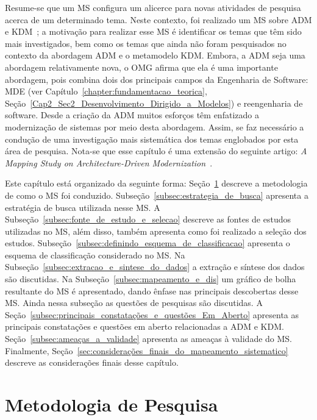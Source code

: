 Resume-se que um MS configura um alicerce para novas atividades de pesquisa acerca de um determinado tema. Neste contexto, foi realizado um MS sobre ADM e KDM~\cite{durelli_systematic_mapping}; a motivação para realizar esse MS é identificar os temas que têm sido mais investigados, bem como os temas que ainda não foram pesquisados no contexto da abordagem ADM e o metamodelo KDM. Embora, a ADM seja uma abordagem relativamente nova, o OMG afirma que ela é uma importante abordagem, pois combina dois dos principais campos da Engenharia de Software: MDE (ver Capítulo~\ref{chapter:fundamentacao_teorica}, Seção~\ref{Cap2_Sec2_Desenvolvimento_Dirigido_a_Modelos}) e reengenharia de software. Desde a criação da ADM muitos esforços têm enfatizado a modernização de sistemas por meio desta abordagem. Assim, se faz necessário a condução de uma investigação mais sistemática dos temas englobados por esta área de pesquisa. Nota-se que esse capítulo é uma extensão do seguinte artigo: \textit{A Mapping Study on Architecture-Driven Modernization}~\cite{durelli_systematic_mapping}.


Este capítulo está organizado da seguinte forma: Seção~\ref{sec:metodologia_pesquisa} descreve a metodologia de como o MS foi conduzido. Subseção~\ref{subsec:estrategia_de_busca} apresenta a estratégia de busca utilizada nesse MS. A Subseção~\ref{subsec:fonte_de_estudo_e_selecao} descreve as fontes de estudos utilizadas no MS, além disso, também apresenta como foi realizado a seleção dos estudos. Subseção~\ref{subsec:definindo_esquema_de_classificacao} apresenta o esquema de classificação considerado no MS. Na Subseção~\ref{subsec:extracao_e_sintese_do_dados} a extração e síntese dos dados são discutidas. Na Subseção~\ref{subsec:mapeamento_e_dis} um gráfico de bolha resultante do MS é apresentado, dando ênfase nas principais descobertas desse MS. Ainda nessa subseção as questões de pesquisas são discutidas. A Seção~\ref{subsec:principais_constatações_e_questões_Em_Aberto} apresenta as principais constatações e questões em aberto relacionadas a ADM e KDM. Seção~\ref{subsec:ameaças_a_validade} apresenta as ameaças à validade do MS. Finalmente, Seção~\ref{sec:considerações_finais_do_mapeamento_sistematico} descreve as considerações finais desse capítulo.



\section{Metodologia de Pesquisa}\label{sec:metodologia_pesquisa}

